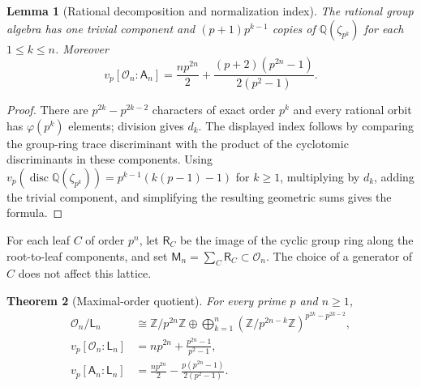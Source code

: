 \documentclass[12pt,a4paper]{article}
\newtheorem{theorem}{Theorem}[section]
\newtheorem{lemma}[theorem]{Lemma}
\theoremstyle{definition}
\newcommand{\Z}{\mathbb Z}
\newcommand{\Q}{\mathbb Q}
\newcommand{\A}{\mathsf A}
\newcommand{\OO}{\mathcal O}
\newcommand{\LL}{\mathsf L}
\newcommand{\vp}{v_p}
\begin{document}
\begin{lemma}[Rational decomposition and normalization index]
\label{lem:rational-decomposition}
The rational group algebra has one trivial component and
$(p+1)p^{k-1}$ copies of $\Q(\zeta_{p^k})$ for each $1\leq k\leq n$.
Moreover
\[
 \vp[\OO_n:\A_n]
 =\frac{np^{2n}}2+
   \frac{(p+2)(p^{2n}-1)}{2(p^2-1)}.
\]
\end{lemma}

\begin{proof}
There are $p^{2k}-p^{2k-2}$ characters of exact order $p^k$ and every
rational orbit has $\varphi(p^k)$ elements; division gives $d_k$.
The displayed index follows by comparing the group-ring trace discriminant
with the product of the cyclotomic discriminants in these components.  Using
\(
 \vp(\operatorname{disc}\Q(\zeta_{p^k}))
 =p^{k-1}(k(p-1)-1)
\)
for $k\geq1$, multiplying by $d_k$, adding the trivial component, and
simplifying the resulting geometric sums gives the formula.
\end{proof}

For each leaf $C$ of order $p^n$, let $\mathsf R_C$ be the image of the
cyclic group ring along the root-to-leaf components, and set
\(
 \mathsf M_n=\sum_C\mathsf R_C\subset\OO_n.
\)
The choice of a generator of $C$ does not affect this lattice.

\begin{theorem}[Maximal-order quotient]
\label{thm:maximal-order-quotient}
For every prime $p$ and $n\geq1$,
\begin{align}
 \OO_n/\LL_n
 &\cong \Z/p^{2n}\Z\oplus
 \bigoplus_{k=1}^n
 (\Z/p^{2n-k}\Z)^{p^{2k}-p^{2k-2}},\label{eq:O-over-L}\\
 \vp[\OO_n:\LL_n]
 &=np^{2n}+\frac{p^{2n}-1}{p^2-1},\label{eq:O-L-index}\\
 \vp[\A_n:\LL_n]
 &=\frac{np^{2n}}2-
   \frac{p(p^{2n}-1)}{2(p^2-1)}.\label{eq:A-L-index}
\end{align}
\end{theorem}
\end{document}
